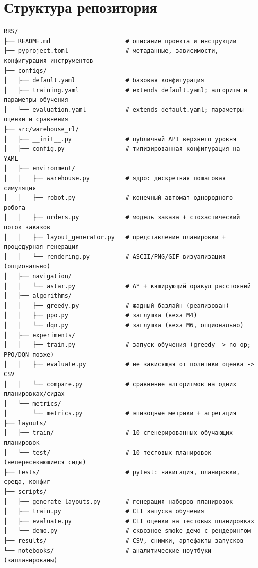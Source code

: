 \documentclass[11pt,a4paper]{article}
\begin{document}
\section{Структура репозитория}
\begin{lstlisting}[style=tree]
RRS/
├── README.md                     # описание проекта и инструкции
├── pyproject.toml                # метаданные, зависимости, конфигурация инструментов
├── configs/
│   ├── default.yaml              # базовая конфигурация
│   ├── training.yaml             # extends default.yaml; алгоритм и параметры обучения
│   └── evaluation.yaml           # extends default.yaml; параметры оценки и сравнения
├── src/warehouse_rl/
│   ├── __init__.py               # публичный API верхнего уровня
│   ├── config.py                 # типизированная конфигурация на YAML
│   ├── environment/
│   │   ├── warehouse.py          # ядро: дискретная пошаговая симуляция
│   │   ├── robot.py              # конечный автомат однородного робота
│   │   ├── orders.py             # модель заказа + стохастический поток заказов
│   │   ├── layout_generator.py   # представление планировки + процедурная генерация
│   │   └── rendering.py          # ASCII/PNG/GIF-визуализация (опционально)
│   ├── navigation/
│   │   └── astar.py              # A* + кэширующий оракул расстояний
│   ├── algorithms/
│   │   ├── greedy.py             # жадный базлайн (реализован)
│   │   ├── ppo.py                # заглушка (веха M4)
│   │   └── dqn.py                # заглушка (веха M6, опционально)
│   ├── experiments/
│   │   ├── train.py              # запуск обучения (greedy -> no-op; PPO/DQN позже)
│   │   ├── evaluate.py           # не зависящая от политики оценка -> CSV
│   │   └── compare.py            # сравнение алгоритмов на одних планировках/сидах
│   └── metrics/
│       └── metrics.py            # эпизодные метрики + агрегация
├── layouts/
│   ├── train/                    # 10 сгенерированных обучающих планировок
│   └── test/                     # 10 тестовых планировок (непересекающиеся сиды)
├── tests/                        # pytest: навигация, планировки, среда, конфиг
├── scripts/
│   ├── generate_layouts.py       # генерация наборов планировок
│   ├── train.py                  # CLI запуска обучения
│   ├── evaluate.py               # CLI оценки на тестовых планировках
│   └── demo.py                   # сквозное smoke-демо с рендерингом
├── results/                      # CSV, снимки, артефакты запусков
└── notebooks/                    # аналитические ноутбуки (запланированы)
\end{lstlisting}
\end{document}
